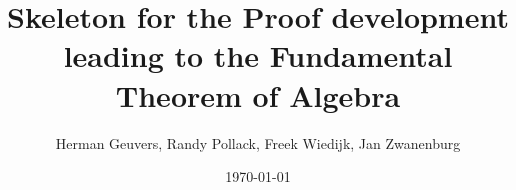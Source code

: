 \documentclass{article}
\begin{document}
\date{\today}
\title{Skeleton for the Proof development leading to the Fundamental
Theorem of Algebra} 
\author{Herman Geuvers, Randy Pollack, Freek Wiedijk, Jan Zwanenburg}
\maketitle




%

%
%









\end{document}
